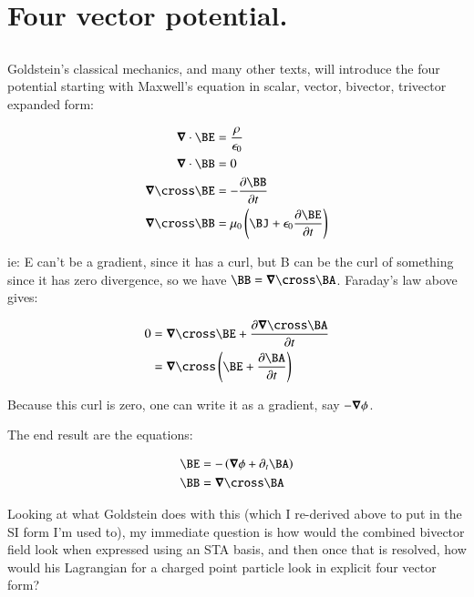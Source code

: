 \chapter{Four vector potential.} 
\label{chap:emPotential}
\date{August 15, 2008}        

\section{}

Goldstein's classical mechanics, and many other texts, will introduce the four potential starting with 
Maxwell's equation in scalar, vector, bivector, trivector expanded form:

\begin{align*}
\spacegrad \cdot \BE &= \frac{\rho}{\epsilon_0} \\
\spacegrad \cdot \BB &= 0 \\
\spacegrad \cross \BE &= - \frac{\partial \BB}{\partial t} \\
\spacegrad \cross \BB &= \mu_0\left(\BJ + \epsilon_0 \frac{\partial \BE}{\partial t}\right) \\
\end{align*}

ie: E can't be a gradient, since it has a curl, but B can be the curl of something since it has zero
divergence, so we have $\BB = \spacegrad \cross \BA$.  Faraday's law above gives:

\begin{align*}
0 &= \spacegrad \cross \BE + \frac{\partial \spacegrad \cross \BA}{\partial t} \\
&= \spacegrad \cross \left(\BE + \frac{\partial \BA}{\partial t}\right) \\
\end{align*}

Because this curl is zero, one can write it as a gradient, say $-\boldsymbol{\nabla} \phi$.

The end result are the equations:

\begin{align}
\BE &= - \left( \spacegrad \phi + \partial_t \BA \right) \label{eqn:fourPot:BE} \\
\BB &= \spacegrad \cross \BA \label{eqn:fourPot:BB} 
\end{align}

Looking at what Goldstein does with this (which I re-derived above to put in the SI form I'm used to), my
immediate question is how would the combined bivector field look when expressed using an STA basis, and 
then once that is resolved, how would his Lagrangian for a charged point particle look in explicit four
vector form?

